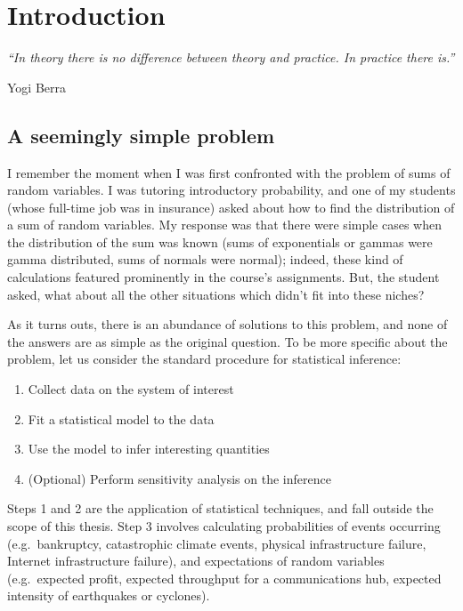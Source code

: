 \chapter{Introduction} \label{chp:intro}

\setcounter{page}{1}

\begin{center}
\emph{``In theory there is no difference between theory and practice. In practice there is.''}
\end{center}
\hfill Yogi Berra~~~~~~~~

\section{A seemingly simple problem}


I remember the moment when I was first confronted with the problem of sums of random variables. I was tutoring introductory probability, and one of my students (whose full-time job was in insurance) asked about how to find the distribution of a sum of random variables. My response was that there were simple cases when the distribution of the sum was known (sums of exponentials or gammas were gamma distributed, sums of normals were normal); indeed, these kind of calculations featured prominently in the course's assignments. But, the student asked, what about all the other situations which didn't fit into these niches? %

As it turns outs, there is an abundance of solutions to this problem, and none of the answers are as simple as the original question.
To be more specific about the problem, let us consider the standard procedure for statistical inference:
\begin{enumerate}
\item Collect data on the system of interest
\item Fit a statistical model to the data
\item Use the model to infer interesting quantities
\item (Optional) Perform sensitivity analysis on the inference
\end{enumerate}
Steps 1 and 2 are the application of statistical techniques, and fall outside the scope of this thesis. Step 3 involves calculating probabilities of events occurring (e.g.\ bankruptcy, catastrophic climate events, physical infrastructure failure, Internet infrastructure failure), and expectations of random variables (e.g.\ expected profit, expected throughput for a communications hub, expected intensity of earthquakes or cyclones).

